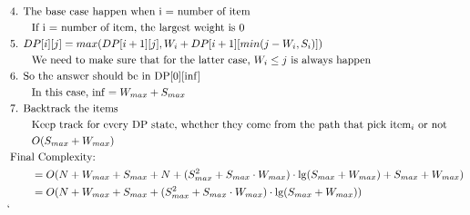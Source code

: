 \documentclass{article}
\begin{document}
\begin{enumerate}
{\begin{align*}
				&\text{4. The base case happen when i = number of item}\\
				&\qquad\text{If i = number of item, the largest weight is 0}\\
				&\text{5. $DP[i][j] = max(DP[i + 1][j], W_i + DP[i + 1][min(j - W_i, S_i)])$}\\
				&\qquad\text{We need to make sure that for the latter case, $W_i \leq j$ is always happen}\\
				&\text{6. So the answer should be in DP[0][$\inf$]}\\
				&\qquad\text{In this case, $\inf = W_{max} + S_{max}$}\\
				&\text{7. Backtrack the items}\\
				&\qquad\text{Keep track for every DP state, whether they come from the path that pick item$_i$ or not}\\
				&\qquad O(S_{max} + W_{max})\\
				&\text{Final Complexity:}\\
				&\qquad =O(N + W_{max} + S_{max} + N + (S_{max}^2 + S_{max}\cdot W_{max})\cdot\lg (S_{max} + W_{max}) + S_{max} + W_{max})\\
				&\qquad =O(N + W_{max} + S_{max} + (S_{max}^2 + S_{max}\cdot W_{max})\cdot\lg (S_{max} + W_{max}))\\
`			\end{align*}
		}
	\end{enumerate}     
\end{document}
